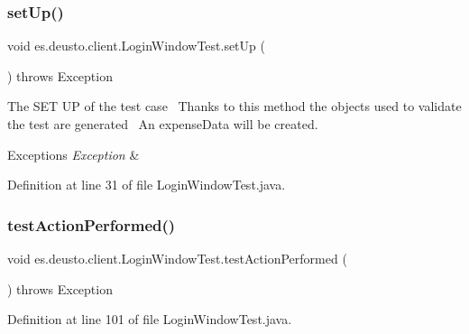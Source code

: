 \subsubsection{\texorpdfstring{set\+Up()}{setUp()}}
{\footnotesize\ttfamily void es.\+deusto.\+client.\+Login\+Window\+Test.\+set\+Up (\begin{DoxyParamCaption}{ }\end{DoxyParamCaption}) throws Exception}

The S\+ET UP of the test case~\newline
 Thanks to this method the objects used to validate the test are generated~\newline
 An expense\+Data will be created.


\begin{DoxyExceptions}{Exceptions}
{\em Exception} & \\
\hline
\end{DoxyExceptions}


Definition at line 31 of file Login\+Window\+Test.\+java.

\mbox{\label{classes_1_1deusto_1_1client_1_1_login_window_test_a404ca444c6d5f9e57ddd9999e4f0c982}} 
\subsubsection{\texorpdfstring{test\+Action\+Performed()}{testActionPerformed()}}
{\footnotesize\ttfamily void es.\+deusto.\+client.\+Login\+Window\+Test.\+test\+Action\+Performed (\begin{DoxyParamCaption}{ }\end{DoxyParamCaption}) throws Exception}



Definition at line 101 of file Login\+Window\+Test.\+java.

\mbox{\label{classes_1_1deusto_1_1client_1_1_login_window_test_ac359eac8035197bd00b65f34d5e74c29}} 
